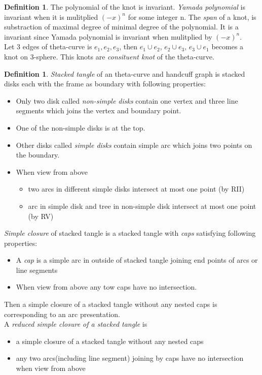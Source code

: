 \documentclass{article}
\theoremstyle{definition}
\newtheorem{defn}[thm]{Definition}
\theoremstyle{theorem}
\theoremstyle{proposition}
\theoremstyle{corollary}
\begin{document}
\begin{defn}
The polynomial of the knot is invariant. \textit{Yamada polynomial} is invariant when it is mulitplied $(-x)^n$ for some integer n. The \textit{span} of a knot, is substraction of maximal degree of minimal degree of the polynomial. It is a invariant since Yamada polynomial is invariant when mulitplied by $(-x)^n$.\\

Let 3 edges of theta-curve is $e_1, e_2, e_3$, then $e_1 \cup e_2$, $e_2 \cup e_3$, $e_3 \cup e_1$ becomes a knot on 3-sphere. This knots are \textit{consituent knot} of the theta-curve.

\begin{defn}
    \textit{Stacked tangle} of an theta-curve and handcuff graph is stacked disks each with the frame as boundary with following properties:
\end{defn}
\begin{itemize}
\item Only two disk called \textit{non-simple disks} contain one vertex and three line
segments which joins the vertex and boundary point.
\item One of the non-simple disks is at the top.
\item Other disks called \textit{simple disks} contain simple arc which joins two
points on the boundary.
\item When view from above
\begin{itemize}
    \item two arcs in different simple disks intersect at most one point (by RII)
    \item arc in simple disk and tree in non-simple disk intersect at most one
point (by RV)
\end{itemize}
\end{itemize}

\textit{Simple closure} of stacked tangle is a stacked tangle with \textit{caps} satisfying following properties:
\begin{itemize}
    \item A \textit{cap} is a simple arc in outside of stacked tangle joining end points of arcs or line segments
    \item When view from above any tow caps have no intersection.
\end{itemize}
Then a simple closure of a stacked tangle without any nested caps is
corresponding to an arc presentation.\\

A \textit{reduced simple closure of a stacked tangle} is
\begin{itemize}
    \item a simple closure of a stacked tangle without any nested caps
    \item any two arcs(including line segment) joining by caps have no intersection when view from above
\end{itemize}


\end{defn}
\end{document}
